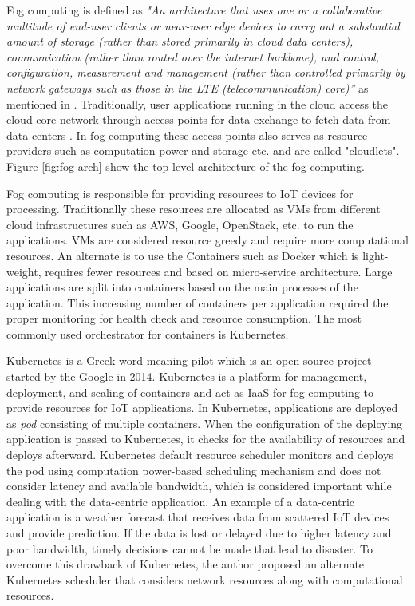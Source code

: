 Fog computing is defined as \emph{"An architecture that uses one or a collaborative multitude of end-user clients or near-user edge devices to carry out a substantial amount of storage (rather than stored primarily in cloud data centers), communication (rather than routed over the internet backbone), and control, configuration, measurement and management (rather than controlled primarily by network gateways such as those in the LTE (telecommunication) core)”} as mentioned in \cite{10.1145/3057266}. Traditionally, user applications running in the cloud access the cloud core network through access points for data exchange to fetch data from data-centers \cite{Bittencourt2017}. In fog computing these access points also serves as resource providers such as computation power and storage etc. and are called "cloudlets"\cite{Bittencourt2017}. Figure \ref{fig:fog-arch} show the top-level architecture of the fog computing. \par
Fog computing is responsible for providing resources to IoT devices for processing\cite{Santos2019}. Traditionally these resources are allocated as VMs from different cloud infrastructures such as AWS, Google, OpenStack, etc. to run the applications. VMs are considered resource greedy and require more computational resources. An alternate is to use the Containers such as Docker which is light-weight, requires fewer resources and based on micro-service architecture. Large applications are split into containers based on the main processes of the application. This increasing number of containers per application required the proper monitoring for health check and resource consumption\cite{k8s}. The most commonly used orchestrator for containers is Kubernetes. \par
Kubernetes is a Greek word meaning pilot which is an open-source project started by the Google in 2014\cite{k8s}. Kubernetes is a platform for management, deployment, and scaling of containers\cite{k8s} and act as IaaS for fog computing to provide resources for IoT applications. In Kubernetes, applications are deployed as \emph{pod} consisting of multiple containers. When the configuration of the deploying application is passed to Kubernetes, it checks for the availability of resources and deploys afterward\cite{k8s}. Kubernetes default resource scheduler monitors and deploys the pod using computation power-based scheduling mechanism and does not consider latency and available bandwidth, which is considered important while dealing with the data-centric application\cite{Santos2019}. An example of a data-centric application is a weather forecast that receives data from scattered IoT devices and provide prediction. If the data is lost or delayed due to higher latency and poor bandwidth, timely decisions cannot be made that lead to disaster. To overcome this drawback of Kubernetes, the author proposed an alternate Kubernetes scheduler that considers network resources along with computational resources\cite{Santos2019}.
